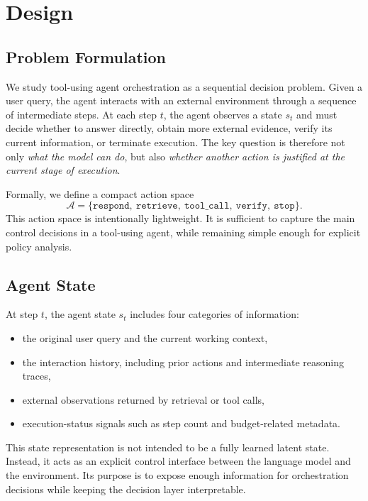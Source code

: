 \section{Design}

\subsection{Problem Formulation}

We study tool-using agent orchestration as a sequential decision problem. Given a user query, the agent interacts with an external environment through a sequence of intermediate steps. At each step $t$, the agent observes a state $s_t$ and must decide whether to answer directly, obtain more external evidence, verify its current information, or terminate execution. The key question is therefore not only \emph{what the model can do}, but also \emph{whether another action is justified at the current stage of execution}.

Formally, we define a compact action space
\[
\mathcal{A} = \{\texttt{respond},\ \texttt{retrieve},\ \texttt{tool\_call},\ \texttt{verify},\ \texttt{stop}\}.
\]
This action space is intentionally lightweight. It is sufficient to capture the main control decisions in a tool-using agent, while remaining simple enough for explicit policy analysis.

\subsection{Agent State}

At step $t$, the agent state $s_t$ includes four categories of information:
\begin{itemize}
    \item the original user query and the current working context,
    \item the interaction history, including prior actions and intermediate reasoning traces,
    \item external observations returned by retrieval or tool calls,
    \item execution-status signals such as step count and budget-related metadata.
\end{itemize}

This state representation is not intended to be a fully learned latent state. Instead, it acts as an explicit control interface between the language model and the environment. Its purpose is to expose enough information for orchestration decisions while keeping the decision layer interpretable.

